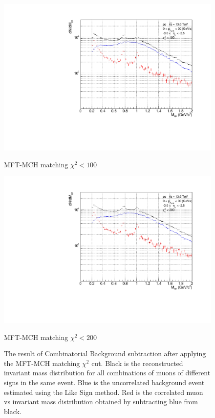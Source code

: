\begin{figure}[H]
\begin{minipage}{0.45\textwidth}
                \end{minipage}
                \\
                \vspace{1em}
                \begin{minipage}{0.45\textwidth}
                    \centering
                    \includegraphics[width=\textwidth]{fig/3_4_4_CB_chi2_100.pdf}
                    \caption*{MFT-MCH matching $\chi^2 < 100$}
                \end{minipage}
                \hfill
                \begin{minipage}{0.45\textwidth}
                    \centering
                    \includegraphics[width=\textwidth]{fig/3_4_4_CB_chi2_200.pdf}
                    \caption*{MFT-MCH matching $\chi^2 < 200$}
                \end{minipage}
                \caption{The result of Combinatorial Background subtraction after applying the MFT-MCH matching $\chi^2$ cut. Black is the reconstructed invariant mass distribution for all combinations of muons of different signs in the same event. Blue is the uncorrelated background event estimated using the Like Sign method. Red is the correlated muon vs invariant mass distribution obtained by subtracting blue from black.}
                \label{Analysis:Dimuon:Matching_CB}
            \end{figure}
